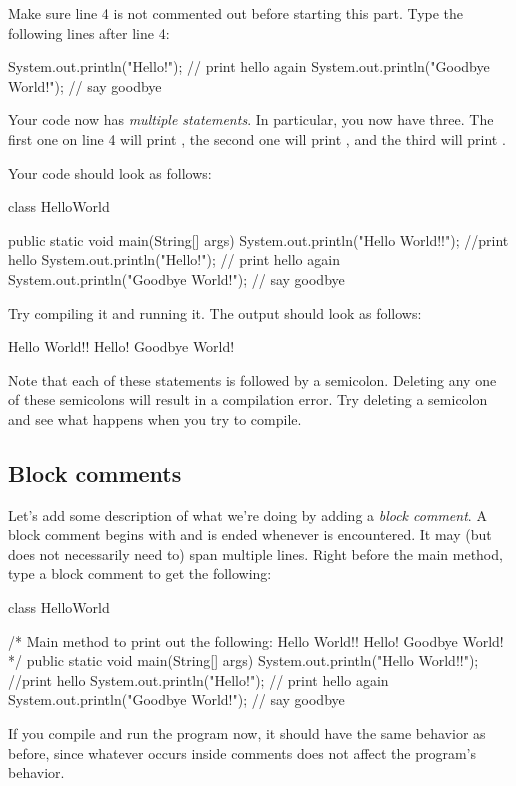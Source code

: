 Make sure line 4 is not commented out before starting this part. Type the following lines after line 4:
\begin{code}
System.out.println("Hello!"); // print hello again 
System.out.println("Goodbye World!"); // say goodbye
\end{code}
Your code now has \emph{multiple statements}. In particular, you now have three. The first one on line 4 will print
, the second one will print , and the third will print .

Your code should look as follows:
\begin{code}
class HelloWorld {
    
    public static void main(String[] args) {
        System.out.println("Hello World!!"); //print hello
        System.out.println("Hello!"); // print hello again
        System.out.println("Goodbye World!"); // say goodbye
    }
    
}
\end{code}
Try compiling it and running it. The output should look as follows:
\begin{code}
Hello World!!
Hello!
Goodbye World!
\end{code}

Note that each of these statements is followed by a semicolon. Deleting any one of these semicolons will result in a compilation error. Try deleting a semicolon and see what happens when you try to compile. 

\subsection{Block comments}

Let's add some description of what we're doing by adding a \emph{block comment}. A block comment begins with \ic{/*} and is ended whenever \ic{*/} is encountered. It may (but does not necessarily need to) span multiple lines. Right before the main method, type a block comment to get the following:
\begin{code}
class HelloWorld {

    /* Main method to print out the following:
         Hello World!!
         Hello!
         Goodbye World!
    */
    public static void main(String[] args) {
        System.out.println("Hello World!!"); //print hello
        System.out.println("Hello!"); // print hello again
        System.out.println("Goodbye World!"); // say goodbye
    }

}
\end{code}
If you compile and run the program now, it should have the same behavior as before, since whatever occurs inside comments does not affect the program's behavior.


